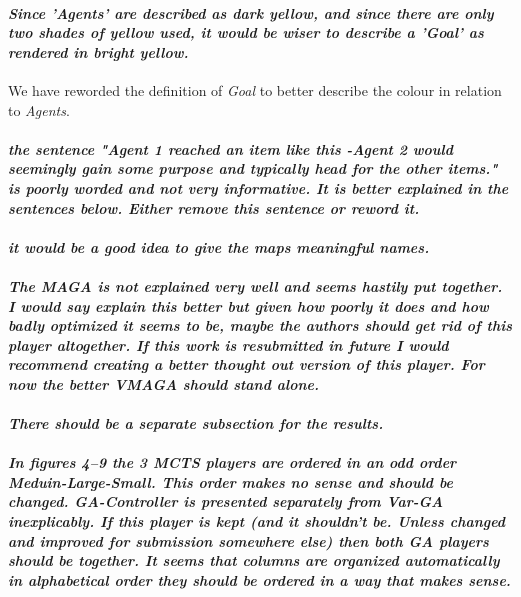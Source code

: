 \documentclass{article}
\begin{document}
\paragraph*{\textit{Since 'Agents' are described as dark yellow, and since there are only two shades of yellow used, it would be wiser to describe a 'Goal' as rendered in bright yellow.}}
We have reworded the definition of \emph{Goal} to better describe the colour in relation to \emph{Agents}.
\paragraph*{\textit{the sentence "Agent 1 reached an item like this -Agent 2 would seemingly gain some purpose and typically head for the other items." is poorly worded and not very informative. It is better explained in the sentences below. Either remove this sentence or reword it.}}

\paragraph*{\textit{it would be a good idea to give the maps meaningful names.}}
\paragraph*{\textit{The MAGA is not explained very well and seems hastily put together. I would say explain this better but given how poorly it does and how badly optimized it seems to be, maybe the authors should get rid of this player altogether. If this work is resubmitted in future I would recommend creating a better thought out version of this player. For now the better VMAGA should stand alone.
}}
\paragraph*{\textit{There should be a separate subsection for the results.}}
\paragraph*{\textit{In figures 4--9 the 3 MCTS players are ordered in an odd order Meduin-Large-Small. This order makes no sense and should be changed. GA-Controller is presented separately from Var-GA inexplicably. If this player is kept (and it shouldn't be. Unless changed and improved for submission somewhere else) then both GA players should be together. It seems that columns are organized automatically in alphabetical order they should be ordered in a way that makes sense.}}
\end{document}

